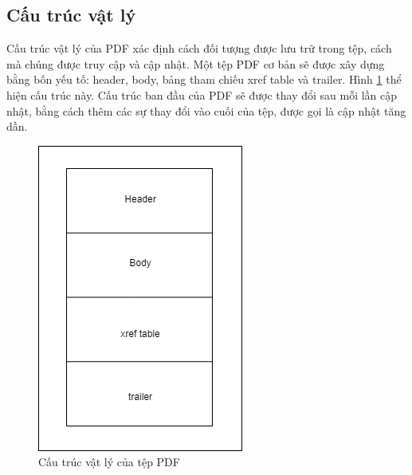 \documentclass[./../main.tex]{subfiles}
\begin{document}
\subsection{Cấu trúc vật lý}
Cấu trúc vật lý của PDF xác định cách đối tượng được lưu trữ trong tệp, cách mà chúng được truy cập và cập nhật.
Một tệp PDF cơ bản sẽ được xây dựng bằng bốn yếu tố: header, body, bảng tham chiếu xref table và trailer. Hình \ref{fig:initstruct} thể hiện cấu trúc này.
Cấu trúc ban đầu của PDF sẽ được thay đổi sau mỗi lần cập nhật, bằng cách thêm các sự thay đổi vào cuối của tệp, được gọi là cập nhật tăng dần.
\begin{figure}[ht!]
	\includegraphics[width=\linewidth]{./images/initial_structure.png}
	\caption{Cấu trúc vật lý của tệp PDF}
	\label{fig:initstruct}
\end{figure}
\end{document}
